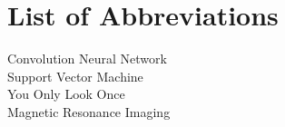 

{
\KECadjusttocspacings %
\makeatletter
\def\@makeschapterhead#1{%
  {\newpage \parindent \z@ \raggedright
    \normalfont
    \interlinepenalty\@M
    \center \fontsize{16pt}{1} \bfseries \MakeUppercase{#1}\par\nobreak
  }}
\makeatother 

\tableofcontents %
\listoffigures %
\listoftables %
}
\chapter*{List of Abbreviations}
   Convolution Neural Network\\
   Support Vector Machine\\
  You Only Look Once\\
   Magnetic Resonance Imaging\\



